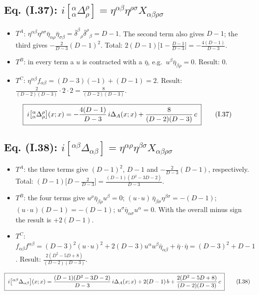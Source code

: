 \subsection{Eq. (I.37): \texorpdfstring{$i[{}^\alpha_\alpha\Delta^\rho_\rho]=\eta^{\alpha\beta}\eta^{\rho\sigma}X_{\alpha\beta\rho\sigma}$}{the double trace} \texorpdfstring{\tD}{}}
\begin{itemize}
\item \(T^A\): \(\eta^{\alpha\beta}\eta^{\rho\sigma}\bar\eta_{\alpha\rho}\bar\eta_{\sigma\beta}=\bar\delta^\beta{}_\rho\bar\delta^\rho{}_\beta=D-1\).
The second term also gives \(D-1\); the third gives \(-\tfrac2{D-3}(D-1)^2\).
Total: \(2(D-1)\bigl[1-\tfrac{D-1}{D-3}\bigr]=-\tfrac{4(D-1)}{D-3}\).
\item \(T^B\): in every term a \(u\) is contracted with a \(\bar\eta\), e.g.\
\(u^\beta\bar\eta_{\beta\rho}=0\). Result: \(0\).
\item \(T^C\): \(\eta^{\alpha\beta}f_{\alpha\beta}=(D-3)(-1)+(D-1)=2\). Result:
\(\tfrac2{(D-2)(D-3)}\cdot2\cdot2=\tfrac8{(D-2)(D-3)}\).
\end{itemize}
\begin{equation*}\label{eq:t4-I37}
\boxed{\;i\bigl[{}^\alpha_\alpha\Delta^\rho_\rho\bigr](x;x)=-\frac{4(D-1)}{D-3}\,i\Delta_A(x;x)+\frac{8}{(D-2)(D-3)}\,c\;}
\tag{I.37}
\end{equation*}

\subsection{Eq. (I.38): \texorpdfstring{$i[{}^{\alpha\beta}\Delta_{\alpha\beta}]=\eta^{\alpha\rho}\eta^{\beta\sigma}X_{\alpha\beta\rho\sigma}$}{the cross trace} \texorpdfstring{\tD}{}}
\begin{itemize}
\item \(T^A\): the three terms give \((D-1)^2\), \(D-1\) and \(-\tfrac{2}{D-3}(D-1)\),
respectively. Total: \((D-1)\bigl[D-\tfrac2{D-3}\bigr]=\tfrac{(D-1)(D^2-3D-2)}{D-3}\).
\item \(T^B\): the four terms give
\(u^\rho\bar\eta_{\beta\rho}u^\beta=0\);
\((u\cdot u)\,\bar\eta_{\beta\sigma}\eta^{\beta\sigma}=-(D-1)\);
\((u\cdot u)(D-1)=-(D-1)\);
\(u^\sigma\bar\eta_{\alpha\sigma}u^\alpha=0\).
With the overall minus sign the result is \(+2(D-1)\).
\item \(T^C\): \(f_{\alpha\beta}f^{\alpha\beta}=(D-3)^2(u\cdot u)^2+2(D-3)u^\alpha u^\beta\bar\eta_{\alpha\beta}+\bar\eta\cdot\bar\eta=(D-3)^2+D-1\).
Result: \(\tfrac{2(D^2-5D+8)}{(D-2)(D-3)}\).
\end{itemize}
\begin{equation*}\label{eq:t4-I38}
\boxed{\;i\bigl[{}^{\alpha\beta}\Delta_{\alpha\beta}\bigr](x;x)=\frac{(D-1)(D^2-3D-2)}{D-3}\,i\Delta_A(x;x)+2(D-1)\,b+\frac{2(D^2-5D+8)}{(D-2)(D-3)}\,c\;}
\tag{I.38}
\end{equation*}

